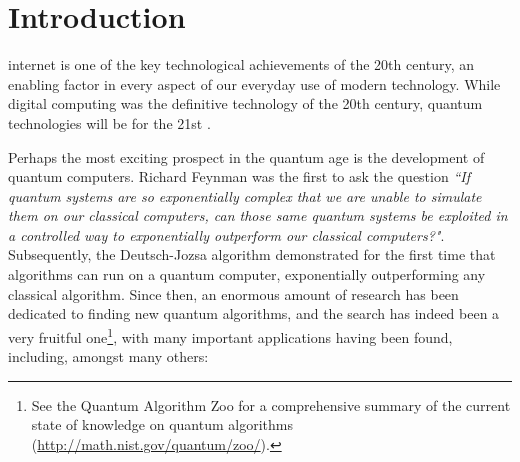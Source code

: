 %
%

\section{Introduction} \label{sec:introduction}

\newline

 internet is one of the key technological achievements of the 20th century, an enabling factor in every aspect of our everyday use of modern technology. While digital computing was the definitive technology of the 20th century, quantum technologies will be for the 21st \cite{bib:NielsenChuang00, bib:Bennett00}. 

Perhaps the most exciting prospect in the quantum age is the development of quantum computers. Richard Feynman \cite{bib:Feynman85} was the first to ask the question \textit{``If quantum systems are so exponentially complex that we are unable to simulate them on our classical computers, can those same quantum systems be exploited in a controlled way to exponentially outperform our classical computers?"}. Subsequently, the Deutsch-Jozsa algorithm \cite{bib:DeutschJozsa92} demonstrated for the first time that algorithms can run on a quantum computer, exponentially outperforming any classical algorithm. Since then, an enormous amount of research has been dedicated to finding new quantum algorithms, and the search has indeed been a very fruitful one\footnote{See the Quantum Algorithm Zoo for a comprehensive summary of the current state of knowledge on quantum algorithms (\href{http://math.nist.gov/quantum/zoo/}{http://math.nist.gov/quantum/zoo/}).}, with many important applications having been found, including, amongst many others:

